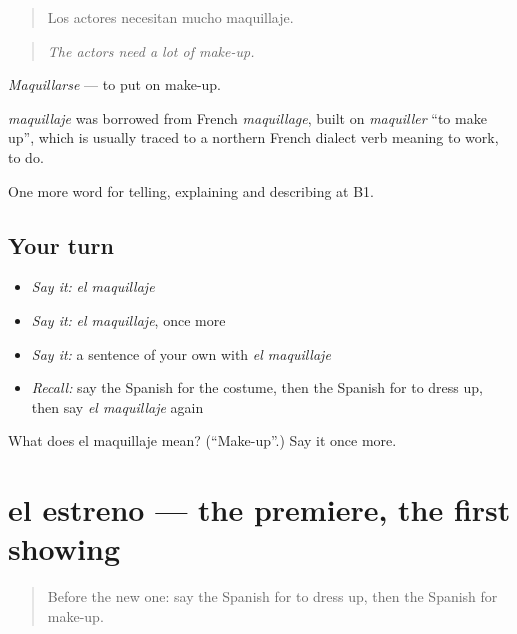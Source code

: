 \begin{quote}
Los actores necesitan mucho maquillaje.
\end{quote}

\begin{quote}
\emph{The actors need a lot of make-up.}
\end{quote}

\emph{Maquillarse} — to put on make-up.

\begin{cousinweb}
\emph{maquillaje} was borrowed from French \emph{maquillage}, built on \emph{maquiller} \textquotedblleft{}to make up\textquotedblright{}, which is usually traced to a northern French dialect verb meaning to work, to do.
\end{cousinweb}

\begin{grammarlens}[title={What you've built}]
One more word for telling, explaining and describing at B1.
\end{grammarlens}

\subsection*{Your turn}
\begin{itemize}
\raggedright
  \item \emph{Say it:} \emph{el maquillaje}
  \item \emph{Say it:} \emph{el maquillaje}, once more
  \item \emph{Say it:} a sentence of your own with \emph{el maquillaje}
  \item \emph{Recall:} say the Spanish for the costume, then the Spanish for to dress up, then say \emph{el maquillaje} again
\end{itemize}

\begin{tcolorbox}[breakable,colback=teal!4,colframe=teal!35!black,title={Before you move on}]
What does el maquillaje mean? (\textquotedblleft{}Make-up\textquotedblright{}.) Say it once more.
\end{tcolorbox}
\section[el estreno]{el estreno — the premiere, the first showing}

\label{lesson:ES-C760-estreno}



\begin{quote}
Before the new one: say the Spanish for to dress up, then the Spanish for make-up.
\end{quote}

